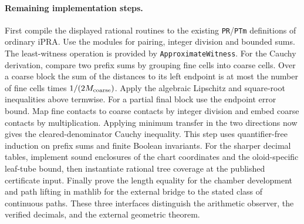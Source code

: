 \paragraph{Remaining implementation steps.}
First compile the displayed rational routines to the existing
\texttt{PR}/\texttt{PTm} definitions of ordinary iPRA. Use the modules for pairing, integer division and bounded sums. The least-witness operation is provided by \texttt{ApproximateWitness}. For the Cauchy derivation,
compare two prefix sums by grouping fine cells into coarse cells.
Over a coarse block the sum of the distances to its left endpoint is
at most the number of fine cells times $1/(2M_{\rm coarse})$.
Apply the algebraic Lipschitz and square-root inequalities above
termwise. For a partial final block use the endpoint error bound.
Map fine contacts to coarse contacts by integer division and embed
coarse contacts by multiplication. Applying minimum transfer in the
two directions now gives the cleared-denominator Cauchy inequality.
This step uses quantifier-free induction on prefix sums and finite
Boolean invariants. For the sharper decimal tables, implement sound
enclosures of the chart coordinates and the oloid-specific leaf-tube
bound, then instantiate rational tree coverage at the published
certificate input. Finally prove the length equality for the chamber development
and path lifting in mathlib for the external bridge to the stated class
of continuous paths. These three interfaces distinguish the arithmetic
observer, the verified decimals, and the external geometric theorem.
